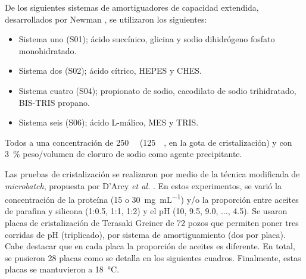 \documentclass[11pt,letterpaper]{article}
\begin{document}
De los siguientes sistemas de amortiguadores de capacidad extendida, desarrollados por Newman \cite{Newman2004}, se utilizaron los siguientes: 
\begin{itemize}
\item Sistema uno (S01); ácido succínico, glicina y sodio dihidrógeno fosfato monohidratado.
\item Sistema dos (S02); ácido cítrico, HEPES y CHES.
\item Sistema cuatro (S04); propionato de sodio, cacodilato de sodio trihidratado, BIS-TRIS propano.
\item Sistema seis (S06); ácido L-málico, MES y TRIS.
\end{itemize}
Todos a una concentración de \SI{250}{\milli\Molar} (\SI{125}{\milli\Molar}, en la gota de cristalización) y con \SI{3}{\percent} peso/volumen de cloruro de sodio como agente precipitante. 
		
Las pruebas de cristalización se realizaron por medio de la técnica modificada de \emph{microbatch}, propuesta por D'Arcy \emph{et al.} \cite{DArcy1996}. En estos experimentos, se varió la concentración de la proteína (15 o \SI{30}{\milli\gram\per\milli\liter}) y/o la proporción entre aceites de parafina y silicona (1:0.5, 1:1, 1:2) y el pH (10, 9.5, 9.0, $\ldots$, 4.5). Se usaron placas de cristalización de Terasaki Greiner de \num{72} pozos que permiten poner tres corridas de pH (triplicado), por sistema de amortiguamiento (dos por placa). Cabe destacar que en cada placa la proporción de aceites es diferente. En total, se pusieron \num{28} placas como se detalla en los siguientes cuadros. Finalmente, estas placas se mantuvieron a \SI{18}{\degreeCelsius}.
				
\end{document}
